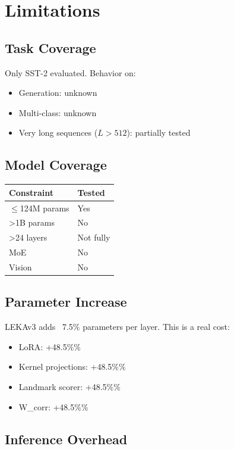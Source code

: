 \section{Limitations}

\subsection{Task Coverage}

Only SST-2 evaluated. Behavior on:
\begin{itemize}
\item Generation: unknown
\item Multi-class: unknown
\item Very long sequences ($L > 512$): partially tested

\end{itemize}
\subsection{Model Coverage}

\begin{table}[H]
\centering
\small
\begin{tabular}{ll}
\toprule
\textbf{Constraint} & \textbf{Tested} \\
\midrule
$\le$124M params & Yes \\
\textgreater{}1B params & No \\
\textgreater{}24 layers & Not fully \\
MoE & No \\
Vision & No \\
\bottomrule
\end{tabular}
\end{table}

\subsection{Parameter Increase}

LEKAv3 adds ~7.5\% parameters per layer. This is a real cost:
\begin{itemize}
\item LoRA: +48.5\%\%
\item Kernel projections: +48.5\%\%
\item Landmark scorer: +48.5\%\%
\item W\_corr: +48.5\%\%

\end{itemize}
\subsection{Inference Overhead}

